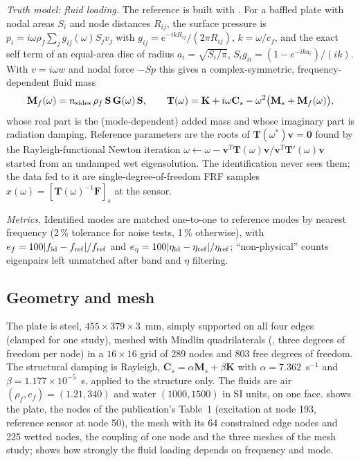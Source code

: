 \emph{Truth model: fluid loading.} The reference is built with \fea{}. For a baffled plate with nodal areas $S_i$ and node distances $R_{ij}$, the surface pressure is $p_i=i\omega\rho_f\sum_jg_{ij}(\omega)S_jv_j$ with $g_{ij}=e^{-ikR_{ij}}/(2\pi R_{ij})$, $k=\omega/c_f$, and the exact self term of an equal-area disc of radius $a_i=\sqrt{S_i/\pi}$, $S_ig_{ii}=(1-e^{-ika_i})/(ik)$. With $v=i\omega w$ and nodal force $-Sp$ this gives a complex-symmetric, frequency-dependent fluid mass
\begin{equation}\label{eq:fsi-fluid}
\mathbf M_f(\omega)=n_{\rm sides}\,\rho_f\,\mathbf S\,\mathbf G(\omega)\,\mathbf S,\qquad\mathbf T(\omega)=\mathbf K+i\omega\mathbf C_s-\omega^2\big(\mathbf M_s+\mathbf M_f(\omega)\big),
\end{equation}
whose real part is the (mode-dependent) added mass and whose imaginary part is radiation damping. Reference parameters are the roots of $\mathbf T(\omega^\ast)\mathbf v=\mathbf 0$ found by the Rayleigh-functional Newton iteration $\omega\leftarrow\omega-\mathbf v^{T}\mathbf T(\omega)\mathbf v/\mathbf v^{T}\mathbf T'(\omega)\mathbf v$ started from an undamped wet eigensolution. The identification never sees them; the data fed to it are single-degree-of-freedom FRF samples $x(\omega)=[\mathbf T(\omega)^{-1}\mathbf F]_s$ at the sensor.

\emph{Metrics.} Identified modes are matched one-to-one to reference modes by nearest frequency (2\,\% tolerance for noise tests, 1\,\% otherwise), with $e_f=100|f_{\rm id}-f_{\rm ref}|/f_{\rm ref}$ and $e_\eta=100|\eta_{\rm id}-\eta_{\rm ref}|/\eta_{\rm ref}$; ``non-physical'' counts eigenpairs left unmatched after band and $\eta$ filtering.

\subsection*{Geometry and mesh}

The plate is steel, $455\times379\times3$~mm, simply supported on all four edges (clamped for one study), meshed with Mindlin quadrilaterals (, three degrees of freedom per node) in a $16\times16$ grid of 289 nodes and 803 free degrees of freedom. The structural damping is Rayleigh, $\mathbf C_s=\alpha\mathbf M_s+\beta\mathbf K$ with $\alpha=7.362$~s$^{-1}$ and $\beta=1.177\times10^{-5}$~s, applied to the structure only. The fluids are air $(\rho_f,c_f)=(1.21,340)$ and water $(1000,1500)$ in SI units, on one face.  shows the plate, the nodes of the publication's Table~1 (excitation at node 193, reference sensor at node 50), the mesh with its 64 constrained edge nodes and 225 wetted nodes, the coupling of one node and the three meshes of the mesh study;  shows how strongly the fluid loading depends on frequency and mode.

